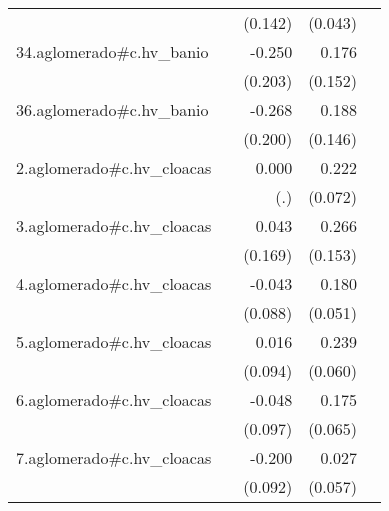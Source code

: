 {\begin{longtable}{l*{4}{D{.}{.}{-1}}}
            &                     &     (0.142)         &     (0.043)         &                     \\
\addlinespace
34.aglomerado#c.hv\_banio&                     &      -0.250         &       0.176         &                     \\
            &                     &     (0.203)         &     (0.152)         &                     \\
\addlinespace
36.aglomerado#c.hv\_banio&                     &      -0.268         &       0.188         &                     \\
            &                     &     (0.200)         &     (0.146)         &                     \\
\addlinespace
2.aglomerado#c.hv\_cloacas&                     &       0.000         &       0.222\sym{**} &                     \\
            &                     &         (.)         &     (0.072)         &                     \\
\addlinespace
3.aglomerado#c.hv\_cloacas&                     &       0.043         &       0.266         &                     \\
            &                     &     (0.169)         &     (0.153)         &                     \\
\addlinespace
4.aglomerado#c.hv\_cloacas&                     &      -0.043         &       0.180\sym{***}&                     \\
            &                     &     (0.088)         &     (0.051)         &                     \\
\addlinespace
5.aglomerado#c.hv\_cloacas&                     &       0.016         &       0.239\sym{***}&                     \\
            &                     &     (0.094)         &     (0.060)         &                     \\
\addlinespace
6.aglomerado#c.hv\_cloacas&                     &      -0.048         &       0.175\sym{**} &                     \\
            &                     &     (0.097)         &     (0.065)         &                     \\
\addlinespace
7.aglomerado#c.hv\_cloacas&                     &      -0.200\sym{*}  &       0.027         &                     \\
            &                     &     (0.092)         &     (0.057)         &                     \\

\end{longtable}}
